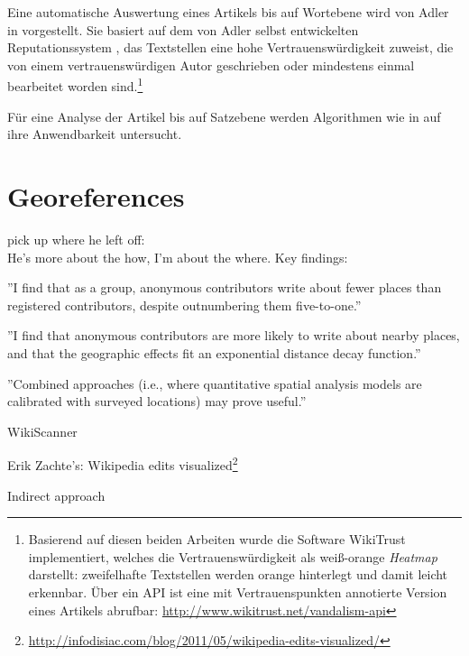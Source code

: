 Eine automatische Auswertung eines Artikels bis auf Wortebene wird von Adler in \cite{adler2008assigning} vorgestellt.
Sie basiert auf dem von Adler selbst entwickelten Reputationssystem \cite{adler2007content}, das Textstellen eine hohe Vertrauenswürdigkeit zuweist, die von einem vertrauenswürdigen Autor geschrieben oder mindestens einmal bearbeitet worden sind.\footnote{Basierend auf diesen beiden Arbeiten wurde die Software WikiTrust implementiert, welches die Vertrauenswürdigkeit als weiß-orange \emph{Heatmap} darstellt: zweifelhafte Textstellen werden orange hinterlegt und damit leicht erkennbar. Über ein API ist eine mit Vertrauenspunkten annotierte Version eines Artikels abrufbar: \url{http://www.wikitrust.net/vandalism-api}\label{wikitrust}}

Für eine Analyse der Artikel bis auf Satzebene werden Algorithmen wie in \cite{kramer2008wiki} auf ihre Anwendbarkeit untersucht.


\section{Georeferences}\label{sec:georeference}


\begin{todos}
    \item pick up where he left off:  
    \\ He's more about the how, I'm about the where. Key findings:
    \item ''I find that as a group, anonymous contributors write about fewer places than registered contributors, despite outnumbering them five-to-one.'' \cite{hardy2011volunteered}
    \item ''I find that anonymous contributors are more likely to write about
nearby places, and that the geographic effects fit an exponential distance decay
function.'' \cite{hardy2011volunteered}
    \item ''Combined approaches (i.e., where quantitative spatial analysis models
are calibrated with surveyed locations) may prove useful.''  \cite[p. 85]{hardy2011volunteered}
    \item WikiScanner
    \item Erik Zachte's: Wikipedia edits visualized\footnote{\url{http://infodisiac.com/blog/2011/05/wikipedia-edits-visualized/}}
    \item Indirect approach 
\end{todos}

